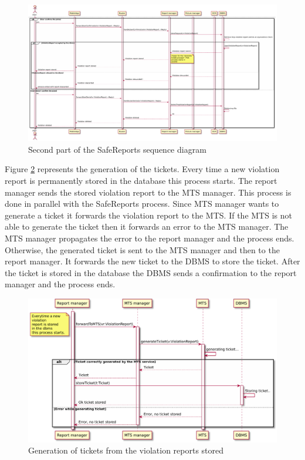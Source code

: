 \documentclass[./main.tex]{subfiles}
\begin{document}
\begin{figure}
\includegraphics[angle=90, width = 0.98 \textwidth, height = 0.98 \textheight]{resources/sequence/safeReports2}
\caption{Second part of the SafeReports sequence diagram}
\label{fig:sequence_safe_reports_2}
\end{figure}

\clearpage

Figure \ref{fig:generate_tickets} represents the generation of the tickets.
Every time a new violation report is permanently stored in the database this process starts.
The report manager sends the stored violation report to the MTS
manager. This process is done in parallel with the SafeReports process.
Since MTS manager wants to generate a ticket it forwards the violation
report to the MTS.
If the MTS is not able to generate the ticket then it forwards an error to the MTS manager. The MTS manager propagates the error to the report manager and the process ends.\\
Otherwise, the generated ticket is sent to the MTS manager and then to the report manager. It forwards the new ticket to the DBMS to store the ticket.
After the ticket is stored in the database the DBMS sends a confirmation to the report manager and the process ends.


\begin{figure}[H]
\includegraphics[width =  \textwidth]{resources/sequence/generate_tickets}
\caption{Generation of tickets from the violation reports stored}
\label{fig:generate_tickets}
\end{figure}
\end{document}
